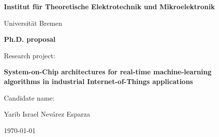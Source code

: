 
\begin{center}
\textbf{Institut f\"ur Theoretische Elektrotechnik und Mikroelektronik}
\vspace{5mm}

{\large Universit\"at Bremen}
\vspace{20mm}

\textbf{\Large Ph.D. proposal}
\vspace{20mm}





Research project:

\textbf{ System-on-Chip architectures for real-time machine-learning algorithms in industrial Internet-of-Things applications}

\vspace{20mm}

Candidate name:

Yarib Israel Nev\'arez Esparza
\vspace{20mm}

\today

\end{center}


\pagebreak